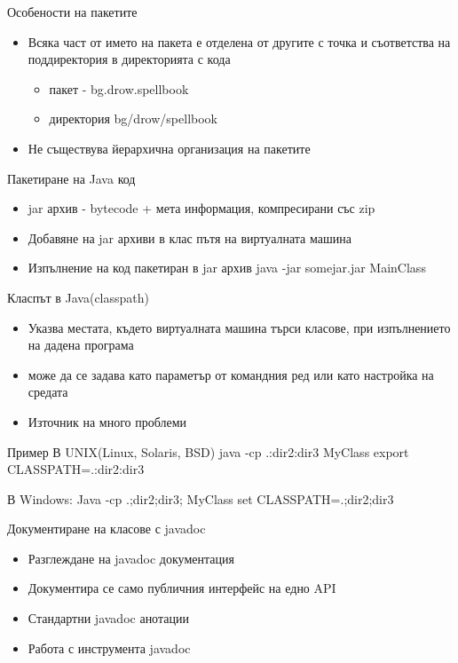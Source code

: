 \documentclass{beamer}
\begin{document}
\begin{frame}{Особености на пакетите}
  \transdissolve
  \begin{itemize}
  \item Всяка част от името на пакета е отделена от другите с точка и
    съответства на поддиректория в директорията с кода
    \begin{itemize}
      \item пакет - bg.drow.spellbook
      \item директория bg/drow/spellbook
    \end{itemize}
  \item Не съществува йерархична организация на пакетите
  \end{itemize}
\end{frame}

\begin{frame}{Пакетиране на Java код}
  \transdissolve
  \begin{itemize}
  \item jar архив - bytecode + мета информация, компресирани със zip
  \item Добавяне на jar архиви в клас пътя на виртуалната машина
  \item Изпълнение на код пакетиран в jar архив
    java -jar somejar.jar MainClass
  \end{itemize}
\end{frame}

\begin{frame}{Класпът в Java(classpath)}
  \transdissolve
  \begin{itemize}
  \item Указва местата, където виртуалната машина търси класове, при
    изпълнението на дадена програма
  \item може да се задава като параметър от командния ред или като
    настройка на средата
  \item Източник на много проблеми
  \end{itemize}
\end{frame}

\begin{frame}{Пример}
  \transdissolve
  В UNIX(Linux, Solaris, BSD)
  java -cp .:dir2:dir3 MyClass
  export CLASSPATH=.:dir2:dir3

  В Windows:
  Java -cp .;dir2;dir3; MyClass
  set CLASSPATH=.;dir2;dir3
\end{frame}

\begin{frame}{Документиране на класове с javadoc}
  \transdissolve
  \begin{itemize}
  \item Разглеждане на javadoc документация
  \item Документира се само публичния интерфейс на едно API
  \item Стандартни javadoc анотации
  \item Работа с инструмента javadoc
  \end{itemize}
\end{frame}
\end{document}
